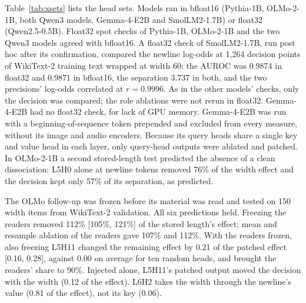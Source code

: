 \documentclass[11pt,a4paper]{article}
\begin{document}
Table~\ref{tab:xsets} lists the head sets. Models ran in bfloat16 (Pythia-1B, OLMo-2-1B, both Qwen3 models, Gemma-4-E2B and SmolLM2-1.7B) or float32 (Qwen2.5-0.5B). Float32 spot checks of Pythia-1B, OLMo-2-1B and the two Qwen3 models agreed with bfloat16. A float32 check of SmolLM2-1.7B, run post hoc after its confirmation, compared the newline log-odds at 1,264 decision points of WikiText-2 training text wrapped at width 60: the AUROC was 0.9874 in float32 and 0.9871 in bfloat16, the separation 3.737 in both, and the two precisions' log-odds correlated at $r = 0.9996$. As in the other models' checks, only the decision was compared; the role ablations were not rerun in float32. Gemma-4-E2B had no float32 check, for lack of GPU memory. Gemma-4-E2B was run with a beginning-of-sequence token prepended and excluded from every measure, without its image and audio encoders. Because its query heads share a single key and value head in each layer, only query-head outputs were ablated and patched. In OLMo-2-1B a second stored-length test predicted the absence of a clean dissociation: L5H0 alone at newline tokens removed 76\% of the width effect and the decision kept only 57\% of its separation, as predicted.

The OLMo follow-up was frozen before its material was read and tested on 150 width items from WikiText-2 validation. All six predictions held. Freezing the readers removed 112\% [105\%, 121\%] of the stored length's effect; mean and resample ablation of the readers gave 107\% and 112\%. With the readers frozen, also freezing L5H11 changed the remaining effect by 0.21 of the patched effect [0.16, 0.28], against 0.00 on average for ten random heads, and brought the readers' share to 90\%. Injected alone, L5H11's patched output moved the decision with the width (0.12 of the effect). L6H2 takes the width through the newline's value (0.81 of the effect), not its key (0.06).
\end{document}
